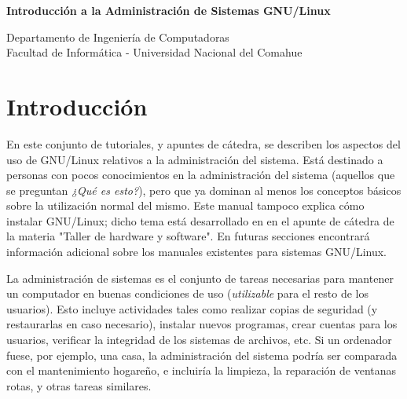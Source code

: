 \documentclass[12pt]{article}
\def\maketitle{

 \makeatletter
 {\color{bl} \centering \huge \sc \textbf{
Introducción a la Administración de Sistemas GNU/Linux \\
 \vspace*{8pt} }\par}
 \makeatother


 \makeatletter
 {\centering \small 
 	Departamento de Ingeniería de Computadoras \\
 	Facultad de Informática - Universidad Nacional del Comahue \\
 	\vspace{20pt} }
 \makeatother

}
\begin{document}
\thispagestyle{empty}
\maketitle
\setlength{\parindent}{0pt}




\section{Introducción}

En este conjunto de tutoriales, y apuntes de cátedra,
se describen los aspectos del uso de GNU/Linux relativos a la administración del
sistema. Está destinado a personas con pocos conocimientos en la
administración del sistema (aquellos que se preguntan \textit{¿Qué es esto?}), pero que ya dominan
al menos los conceptos básicos sobre la utilización normal del mismo. Este
manual tampoco explica cómo instalar GNU/Linux; dicho tema está desarrollado en
en el apunte de cátedra de la materia "Taller de hardware y software". En futuras secciones encontrará información
adicional sobre los manuales existentes para sistemas GNU/Linux.  

La administración de sistemas es el conjunto de tareas necesarias para
mantener un computador en buenas condiciones de uso (\textit{utilizable} para el resto
de los usuarios). Esto incluye actividades
tales como realizar copias de seguridad (y restaurarlas en caso necesario),
instalar nuevos programas, crear cuentas para los usuarios,
verificar la integridad de los sistemas de archivos, etc. Si un ordenador
fuese, por ejemplo, una casa, la administración del sistema podría ser comparada
con el 
mantenimiento hogareño, e incluiría la limpieza, la reparación de ventanas rotas, y otras
tareas similares.  

\end{document}
